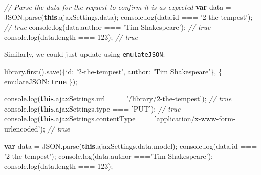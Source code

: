 \documentclass[9pt]{book}
\newenvironment{Shaded}{}{}
\newcommand{\KeywordTok}[1]{\textcolor[rgb]{0.00,0.44,0.13}{\textbf{{#1}}}}
\newcommand{\DataTypeTok}[1]{\textcolor[rgb]{0.56,0.13,0.00}{{#1}}}
\newcommand{\DecValTok}[1]{\textcolor[rgb]{0.25,0.63,0.44}{{#1}}}
\newcommand{\StringTok}[1]{\textcolor[rgb]{0.25,0.44,0.63}{{#1}}}
\newcommand{\CommentTok}[1]{\textcolor[rgb]{0.38,0.63,0.69}{\textit{{#1}}}}
\newcommand{\OtherTok}[1]{\textcolor[rgb]{0.00,0.44,0.13}{{#1}}}
\newcommand{\FunctionTok}[1]{\textcolor[rgb]{0.02,0.16,0.49}{{#1}}}
\newcommand{\NormalTok}[1]{{#1}}
\begin{document}
\begin{Shaded}
\begin{Highlighting}[]
\CommentTok{// Parse the data for the request to confirm it is as expected}
\KeywordTok{var} \NormalTok{data = }\OtherTok{JSON}\NormalTok{.}\FunctionTok{parse}\NormalTok{(}\KeywordTok{this}\NormalTok{.}\OtherTok{ajaxSettings}\NormalTok{.}\FunctionTok{data}\NormalTok{);}
\OtherTok{console}\NormalTok{.}\FunctionTok{log}\NormalTok{(}\OtherTok{data}\NormalTok{.}\FunctionTok{id} \NormalTok{=== }\StringTok{'2-the-tempest'}\NormalTok{);  }\CommentTok{// true}
\OtherTok{console}\NormalTok{.}\FunctionTok{log}\NormalTok{(}\OtherTok{data}\NormalTok{.}\FunctionTok{author} \NormalTok{=== }\StringTok{'Tim Shakespeare'}\NormalTok{); }\CommentTok{// true}
\OtherTok{console}\NormalTok{.}\FunctionTok{log}\NormalTok{(}\OtherTok{data}\NormalTok{.}\FunctionTok{length} \NormalTok{=== }\DecValTok{123}\NormalTok{); }\CommentTok{// true}
\end{Highlighting}
\end{Shaded}

Similarly, we could just update using \texttt{emulateJSON}:

\begin{Shaded}
\begin{Highlighting}[]
\OtherTok{library}\NormalTok{.}\FunctionTok{first}\NormalTok{().}\FunctionTok{save}\NormalTok{(\{}\DataTypeTok{id}\NormalTok{: }\StringTok{'2-the-tempest'}\NormalTok{, }\DataTypeTok{author}\NormalTok{: }\StringTok{'Tim Shakespeare'}\NormalTok{\}, \{}
  \DataTypeTok{emulateJSON}\NormalTok{: }\KeywordTok{true}
\NormalTok{\});}

\OtherTok{console}\NormalTok{.}\FunctionTok{log}\NormalTok{(}\KeywordTok{this}\NormalTok{.}\OtherTok{ajaxSettings}\NormalTok{.}\FunctionTok{url} \NormalTok{=== }\StringTok{'/library/2-the-tempest'}\NormalTok{); }\CommentTok{// true}
\OtherTok{console}\NormalTok{.}\FunctionTok{log}\NormalTok{(}\KeywordTok{this}\NormalTok{.}\OtherTok{ajaxSettings}\NormalTok{.}\FunctionTok{type} \NormalTok{=== }\StringTok{'PUT'}\NormalTok{); }\CommentTok{// true}
\OtherTok{console}\NormalTok{.}\FunctionTok{log}\NormalTok{(}\KeywordTok{this}\NormalTok{.}\OtherTok{ajaxSettings}\NormalTok{.}\FunctionTok{contentType} \NormalTok{===}\StringTok{'application/x-www-form-urlencoded'}\NormalTok{); }\CommentTok{// true}

\KeywordTok{var} \NormalTok{data = }\OtherTok{JSON}\NormalTok{.}\FunctionTok{parse}\NormalTok{(}\KeywordTok{this}\NormalTok{.}\OtherTok{ajaxSettings}\NormalTok{.}\OtherTok{data}\NormalTok{.}\FunctionTok{model}\NormalTok{);}
\OtherTok{console}\NormalTok{.}\FunctionTok{log}\NormalTok{(}\OtherTok{data}\NormalTok{.}\FunctionTok{id} \NormalTok{=== }\StringTok{'2-the-tempest'}\NormalTok{);}
\OtherTok{console}\NormalTok{.}\FunctionTok{log}\NormalTok{(}\OtherTok{data}\NormalTok{.}\FunctionTok{author} \NormalTok{===}\StringTok{'Tim Shakespeare'}\NormalTok{);}
\OtherTok{console}\NormalTok{.}\FunctionTok{log}\NormalTok{(}\OtherTok{data}\NormalTok{.}\FunctionTok{length} \NormalTok{=== }\DecValTok{123}\NormalTok{);}
\end{Highlighting}
\end{Shaded}
\end{document}
